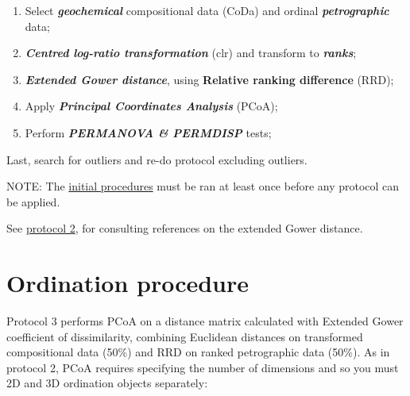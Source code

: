 \documentclass[12pt,]{book}
\providecommand{\tightlist}{%
  \setlength{\itemsep}{0pt}\setlength{\parskip}{0pt}}
\begin{document}
\begin{enumerate}
\def\labelenumi{\arabic{enumi}.}
\tightlist
\item
  Select \textbf{\emph{geochemical}} compositional data (CoDa) and ordinal \textbf{\emph{petrographic}} data;
\item
  \textbf{\emph{Centred log-ratio transformation}} (clr) and transform to \textbf{\emph{ranks}};
\item
  \textbf{\emph{Extended Gower distance}}, using \textbf{Relative ranking difference} (RRD);
\item
  Apply \textbf{\emph{Principal Coordinates Analysis}} (PCoA);
\item
  Perform \textbf{\emph{PERMANOVA \& PERMDISP}} tests;
\end{enumerate}

Last, search for outliers and re-do protocol excluding outliers.

NOTE: The \protect\hyperlink{init}{initial procedures} must be ran at least once before any protocol can be applied.

See \protect\hyperlink{prot2}{protocol 2}, for consulting references on the extended Gower distance.

\hypertarget{ordination-procedure-2}{%
\section{Ordination procedure}\label{ordination-procedure-2}}

Protocol 3 performs PCoA on a distance matrix calculated with Extended Gower coefficient of dissimilarity, combining Euclidean distances on transformed compositional data (50\%) and RRD on ranked petrographic data (50\%). As in protocol 2, PCoA requires specifying the number of dimensions and so you must 2D and 3D ordination objects separately:
\end{document}
